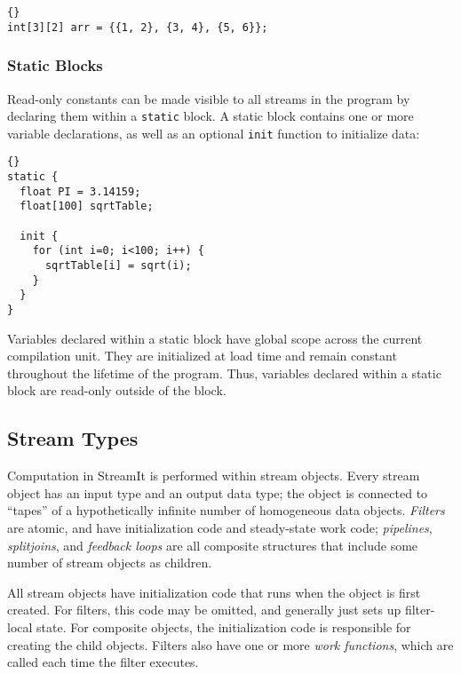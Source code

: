 \documentclass[11pt]{article}
\begin{document}
\begin{lstlisting}{}
int[3][2] arr = {{1, 2}, {3, 4}, {5, 6}};
\end{lstlisting}{}

\subsubsection{Static Blocks}

Read-only constants can be made visible to all streams in the program
by declaring them within a \lstinline|static| block.  A static block
contains one or more variable declarations, as well as an optional
\lstinline|init| function to initialize data:

\begin{lstlisting}{}
static {
  float PI = 3.14159;
  float[100] sqrtTable;

  init {
    for (int i=0; i<100; i++) {
      sqrtTable[i] = sqrt(i);
    }
  }
}
\end{lstlisting}

Variables declared within a static block have global scope across the
current compilation unit.  They are initialized at load time and
remain constant throughout the lifetime of the program.  Thus,
variables declared within a static block are read-only outside of the
block.

%

\subsection{Stream Types}

Computation in StreamIt is performed within stream objects.  Every
stream object has an input type and an output data type; the object is
connected to ``tapes'' of a hypothetically infinite number of
homogeneous data objects.  \emph{Filters} are atomic, and have
initialization code and steady-state work code; \emph{pipelines},
\emph{splitjoins}, and \emph{feedback loops} are all composite
structures that include some number of stream objects as children.

All stream objects have initialization code that runs when the object
is first created.  For filters, this code may be omitted, and
generally just sets up filter-local state.  For composite objects, the
initialization code is responsible for creating the child objects.
Filters also have one or more \emph{work functions}, which are called
each time the filter executes.
\end{document}
